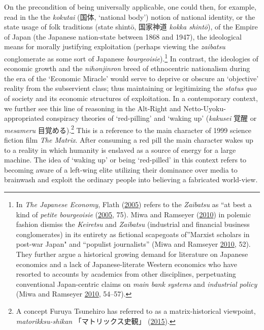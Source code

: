 \documentclass[10pt,british,A4paper,oneside]{memoir}
\begin{document}
On the precondition of being universally applicable, one could then, for
example, read in the the \emph{kokutai} (国体, `national body') notion
of national identity, or the state usage of folk traditions (state
shintō, 国家神道 \emph{kokka shintō}), of the Empire of Japan (the
Japanese nation-state between 1868 and 1947), the ideological means for
morally justifying exploitation (perhaps viewing the \emph{zaibatsu}
conglomerate as some sort of Japanese \emph{bourgeoisie}).\footnote{In
  \emph{The Japanese Economy}, Flath
  (\protect\hyperlink{ref-flath_japanese_2005}{2005}) refers to the
  \emph{Zaibatsu} as ``at best a kind of \emph{petite bourgeoisie}
  (\protect\hyperlink{ref-flath_japanese_2005}{2005}, 75). Miwa and
  Ramseyer (\protect\hyperlink{ref-miwa_fable_2010}{2010}) in polemic
  fashion dismiss the \emph{Keiretsu} and \emph{Zaibatsu} (industrial
  and financial business conglomerates) in its entirety as fictional
  scapegoats of''Marxist scholars in post-war Japan" and ``populist
  journalists'' (Miwa and Ramseyer
  \protect\hyperlink{ref-miwa_fable_2010}{2010}, 52). They further argue
  a historical growing demand for literature on Japanese economics and a
  lack of Japanese-literate Western economics who have resorted to
  accounts by academics from other disciplines, perpetuating
  conventional Japan-centric claims on \emph{main bank systems} and
  \emph{industrial policy} (Miwa and Ramseyer
  \protect\hyperlink{ref-miwa_fable_2010}{2010}, 54--57).} In contrast,
the ideologies of economic growth and the \emph{nihonjinron} breed of
ethnocentric nationalism during the era of the `Economic Miracle' would
serve to deprive or obscure an `objective' reality from the subservient
class; thus maintaining or legitimizing the \emph{status quo} of society
and its economic structures of exploitation. In a contemporary context,
we further see this line of reasoning in the Alt-Right and
Netto-Uyoku-appropriated conspiracy theories of `red-pilling' and
`waking up' (\emph{kakusei} 覚醒 or \emph{mesameru} 目覚める).\footnote{A
  concept Furuya Tsunehiro has referred to as a matrix-historical
  viewpoint, \emph{matorikksu-shikan} 「マトリックス史観」
  (\protect\hyperlink{ref-furuya_eng._2015}{2015}).} This is a reference
to the main character of 1999 science fiction film \emph{The Matrix}.
After consuming a red pill the main character wakes up to a reality in which
humanity is enslaved as a source of energy for a large machine. The idea
of `waking up' or being `red-pilled' in this context refers to becoming
aware of a left-wing elite utilizing their dominance over
media to brainwash and exploit the ordinary people into believing a
fabricated world-view.
\end{document}
